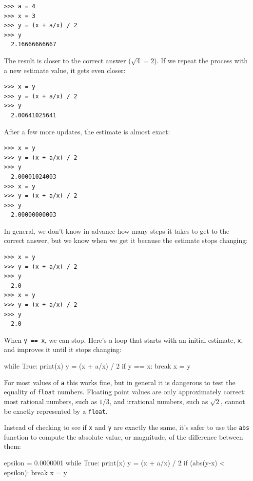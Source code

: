 \begin{Verbatim}[frame=single]
>>> a = 4
>>> x = 3
>>> y = (x + a/x) / 2
>>> y
  2.16666666667
\end{Verbatim}
%
The result is closer to the correct answer ($\sqrt{4} = 2$). If we repeat the process with a new estimate value, it gets even closer:

\begin{Verbatim}[frame=single]
>>> x = y
>>> y = (x + a/x) / 2
>>> y
  2.00641025641
\end{Verbatim}
%
After a few more updates, the estimate is almost exact:

\begin{Verbatim}[frame=single]
>>> x = y
>>> y = (x + a/x) / 2
>>> y
  2.00001024003
>>> x = y
>>> y = (x + a/x) / 2
>>> y
  2.00000000003
\end{Verbatim}
%
In general, we don't know in advance how many steps it takes to get to the correct answer, but we know when we get it because the estimate stops changing:

\begin{Verbatim}[frame=single]
>>> x = y
>>> y = (x + a/x) / 2
>>> y
  2.0
>>> x = y
>>> y = (x + a/x) / 2
>>> y
  2.0
\end{Verbatim}
%
When \texttt{y == x}, we can stop. Here's a loop that starts with an initial estimate, \texttt{x}, and improves it until it stops changing:

\begin{python}[frame=single]
while True:
    print(x)
    y = (x + a/x) / 2
    if y == x:
        break
    x = y
\end{python}
%
For most values of \texttt{a} this works fine, but in general it is dangerous to test the equality of \texttt{float} numbers. Floating point values are only approximately correct: most rational numbers, such as $1/3$, and irrational numbers, such as $\sqrt{2}$, cannot be exactly represented by a \texttt{float}.

Instead of checking to see if \texttt{x} and \texttt{y} are exactly the same, it's safer to use the \texttt{abs} function to compute the absolute value, or magnitude, of the difference between them:

\begin{python}[frame=single]
epsilon = 0.0000001
while True:
    print(x)
    y = (x + a/x) / 2
    if (abs(y-x) < epsilon):
        break
    x = y
\end{python}

